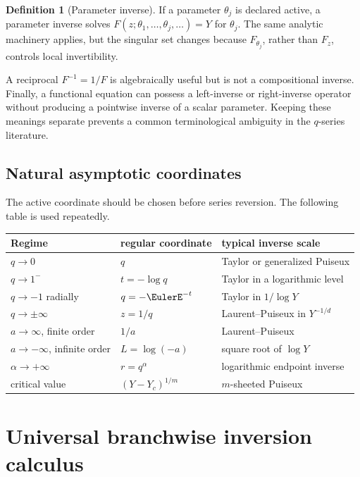 \documentclass[11pt,a4paper,oneside,openany]{book}
\theoremstyle{definition}
\newtheorem{definition}[theorem]{Definition}
\theoremstyle{remark}
\begin{document}
\begin{definition}[Parameter inverse]
If a parameter \(\theta_j\) is declared active, a parameter inverse solves
\(F(z;\theta_1,\ldots,\theta_j,\ldots)=Y\) for \(\theta_j\).  The same
analytic machinery applies, but the singular set changes because
\(F_{\theta_j}\), rather than \(F_z\), controls local invertibility.
\end{definition}

A reciprocal \(F^{-1}=1/F\) is algebraically useful but is not a
compositional inverse.  Finally, a functional equation can possess a
left-inverse or right-inverse operator without producing a pointwise inverse
of a scalar parameter.  Keeping these meanings separate prevents a common
terminological ambiguity in the \(q\)-series literature.

\section{Natural asymptotic coordinates}

The active coordinate should be chosen before series reversion.  The
following table is used repeatedly.

\begin{center}
\begin{tabular}{@{}lll@{}}
\toprule
Regime & regular coordinate & typical inverse scale\\
\midrule
\(q\to0\) & \(q\) & Taylor or generalized Puiseux\\
\(q\to1^-\) & \(t=-\log q\) & Taylor in a logarithmic level\\
\(q\to-1\) radially & \(q=-\EulerE^{-t}\) & Taylor in \(1/\log Y\)\\
\(q\to\pm\infty\) & \(z=1/q\) & Laurent--Puiseux in \(Y^{-1/d}\)\\
\(a\to\infty\), finite order & \(1/a\) & Laurent--Puiseux\\
\(a\to-\infty\), infinite order & \(L=\log(-a)\) & square root of \(\log Y\)\\
\(\alpha\to+\infty\) & \(r=q^\alpha\) & logarithmic endpoint inverse\\
critical value & \((Y-Y_c)^{1/m}\) & \(m\)-sheeted Puiseux\\
\bottomrule
\end{tabular}
\end{center}

\chapter{Universal branchwise inversion calculus}
\end{document}
